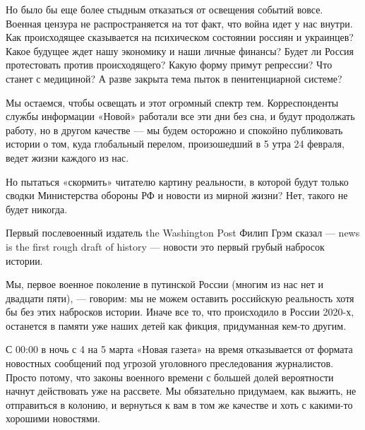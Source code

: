 Но было бы еще более стыдным отказаться от освещения событий вовсе. Военная цензура не распространяется на тот факт, что война идет у нас внутри. Как происходящее сказывается на психическом состоянии россиян и украинцев? Какое будущее ждет нашу экономику и наши личные финансы? Будет ли Россия протестовать против происходящего? Какую форму примут репрессии? Что станет с медициной? А разве закрыта тема пыток в пенитенциарной системе?

Мы остаемся, чтобы освещать и этот огромный спектр тем. Корреспонденты службы информации «Новой» работали все эти дни без сна, и будут продолжать работу, но в другом качестве — мы будем осторожно и спокойно публиковать истории о том, куда глобальный перелом, произошедший в 5 утра 24 февраля, ведет жизни каждого из нас.

Но пытаться «скормить» читателю картину реальности, в которой будут только сводки Министерства обороны РФ и новости из мирной жизни? Нет, такого не будет никогда.

Первый послевоенный издатель the Washington Post Филип Грэм сказал — news is the first rough draft of history — новости это первый грубый набросок истории.

Мы, первое военное поколение в путинской России (многим из нас нет и двадцати пяти), — говорим: мы не можем оставить российскую реальность хотя бы без этих набросков истории. Иначе все то, что происходило в России 2020-х, останется в памяти уже наших детей как фикция, придуманная кем-то другим.

С 00:00 в ночь с 4 на 5 марта «Новая газета» на время отказывается от формата новостных сообщений под угрозой уголовного преследования журналистов. Просто потому, что законы военного времени с большей долей вероятности начнут действовать уже на рассвете. Мы обязательно придумаем, как выжить, не отправиться в колонию, и вернуться к вам в том же качестве и хоть с какими-то хорошими новостями.